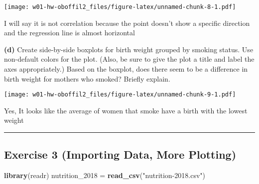 \documentclass[]{article}
\newenvironment{Shaded}{\begin{snugshade}}{\end{snugshade}}
\newcommand{\DataTypeTok}[1]{\textcolor[rgb]{0.13,0.29,0.53}{#1}}
\newcommand{\DecValTok}[1]{\textcolor[rgb]{0.00,0.00,0.81}{#1}}
\newcommand{\KeywordTok}[1]{\textcolor[rgb]{0.13,0.29,0.53}{\textbf{#1}}}
\newcommand{\NormalTok}[1]{#1}
\newcommand{\OperatorTok}[1]{\textcolor[rgb]{0.81,0.36,0.00}{\textbf{#1}}}
\newcommand{\StringTok}[1]{\textcolor[rgb]{0.31,0.60,0.02}{#1}}
\begin{document}
\texttt{[image: w01-hw-oboffil2\_files/figure-latex/unnamed-chunk-8-1.pdf]}

I will say it is not correlation because the point doesn't show a
specific direction and the regression line is almost horizontal

\textbf{(d)} Create side-by-side boxplots for birth weight grouped by
smoking status. Use non-default colors for the plot. (Also, be sure to
give the plot a title and label the axes appropriately.) Based on the
boxplot, does there seem to be a difference in birth weight for mothers
who smoked? Briefly explain.

\begin{Shaded}
\end{Shaded}

\texttt{[image: w01-hw-oboffil2\_files/figure-latex/unnamed-chunk-9-1.pdf]}

Yes, It looks like the average of women that smoke have a birth with the
lowest weight

\begin{center}\rule{0.5\linewidth}{0.5pt}\end{center}

\hypertarget{exercise-3-importing-data-more-plotting}{%
\subsection{Exercise 3 (Importing Data, More
Plotting)}\label{exercise-3-importing-data-more-plotting}}

\begin{Shaded}
\begin{Highlighting}[]
\KeywordTok{library}\NormalTok{(readr)}
\NormalTok{nutrition_}\DecValTok{2018}\NormalTok{ =}\StringTok{ }\KeywordTok{read_csv}\NormalTok{(}\StringTok{"nutrition-2018.csv"}\NormalTok{)}
\end{Highlighting}
\end{Shaded}
\end{document}
